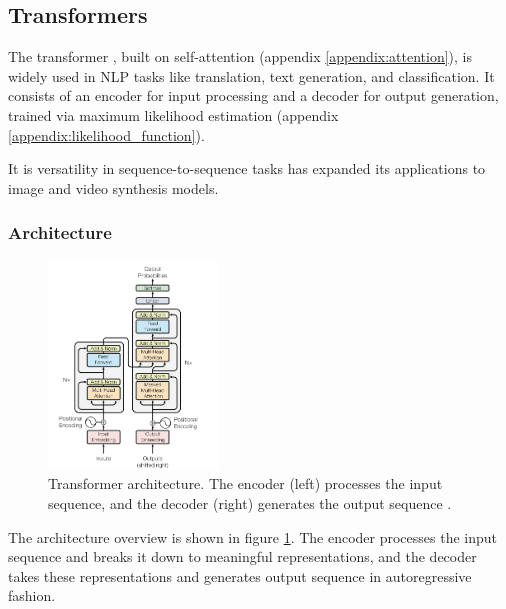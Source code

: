 \subsection{Transformers}
\label{appendix:transformers}

The transformer \cite{transformer}, built on self-attention (appendix \ref{appendix:attention}), is widely used in NLP tasks like translation, text generation, and classification. It consists of an encoder for input processing and a decoder for output generation, trained via maximum likelihood estimation (appendix \ref{appendix:likelihood_function}).

It is versatility in sequence-to-sequence tasks has expanded its applications to image and video synthesis models.





\subsubsection{Architecture}

\begin{figure}
    \centering
    \includegraphics[width=0.4\textwidth]{images/appendix/transformer/architecture.png}
    \caption{Transformer architecture. The encoder (left) processes the input sequence, and the decoder (right) generates the output sequence \cite{transformer}.}
    \label{fig:appendix_transformer_architecture}
\end{figure}

The architecture overview is shown in figure \ref{fig:appendix_transformer_architecture}. The encoder processes the input sequence and breaks it down to meaningful representations, and the decoder takes these representations and generates output sequence in autoregressive fashion. 









